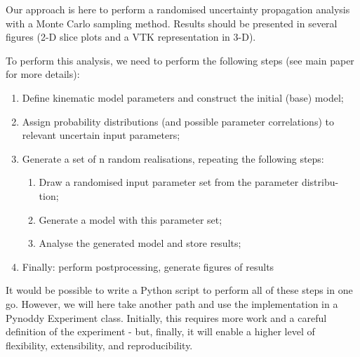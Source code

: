 \documentclass[a4paper,10pt,english]{sphinxmanual}
\begin{document}
Our approach is here to perform a randomised uncertainty propagation
analysis with a Monte Carlo sampling method. Results should be presented
in several figures (2-D slice plots and a VTK representation in 3-D).

To perform this analysis, we need to perform the following steps (see
main paper for more details):
\begin{enumerate}
\item {} 
Define kinematic model parameters and construct the initial (base)
model;

\item {} 
Assign probability distributions (and possible parameter
correlations) to relevant uncertain input parameters;

\item {} 
Generate a set of n random realisations, repeating the following
steps:
\begin{enumerate}
\item {} 
Draw a randomised input parameter set from the parameter distribu-
tion;

\item {} 
Generate a model with this parameter set;

\item {} 
Analyse the generated model and store results;

\end{enumerate}

\item {} 
Finally: perform postprocessing, generate figures of results

\end{enumerate}

It would be possible to write a Python script to perform all of these
steps in one go. However, we will here take another path and use the
implementation in a Pynoddy Experiment class. Initially, this requires
more work and a careful definition of the experiment - but, finally, it
will enable a higher level of flexibility, extensibility, and
reproducibility.
\end{document}
